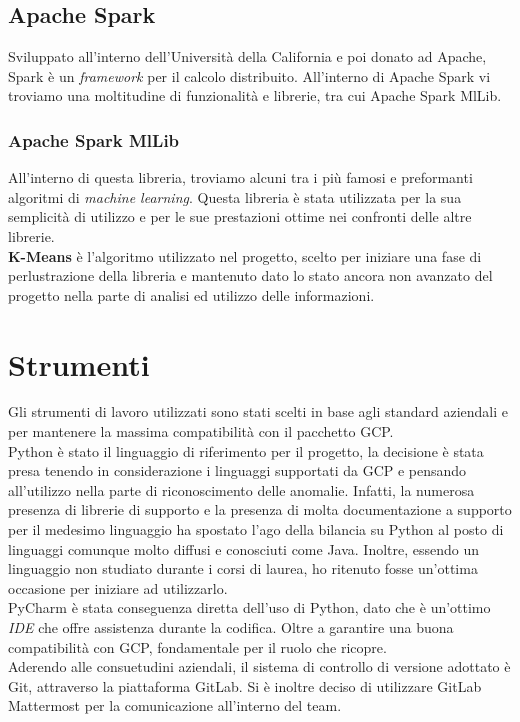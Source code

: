 \subsection{Apache Spark}
Sviluppato all'interno dell'Università della California e poi donato ad Apache, Spark è un \emph{framework} per il calcolo distribuito. 
All'interno di Apache Spark vi troviamo una moltitudine di funzionalità e librerie, tra cui Apache Spark MlLib.
\subsubsection{Apache Spark MlLib}
All'interno di questa libreria, troviamo alcuni tra i più famosi e preformanti algoritmi di \emph{machine learning}. Questa libreria è stata utilizzata per la sua semplicità di utilizzo e per le sue prestazioni ottime nei confronti delle altre librerie.
\\
\textbf{K-Means} \cite{k-means} è  l'algoritmo utilizzato nel progetto, scelto per iniziare una fase di perlustrazione della libreria e mantenuto dato lo stato ancora non avanzato del progetto nella parte di analisi ed utilizzo delle informazioni.
\section{Strumenti}
Gli strumenti di lavoro utilizzati sono stati scelti in base agli standard aziendali e per mantenere la massima compatibilità con il pacchetto GCP.
\\
Python è stato il linguaggio di riferimento per il progetto, la decisione è stata presa tenendo in considerazione i linguaggi supportati da GCP e pensando all'utilizzo nella parte di riconoscimento delle anomalie. Infatti, la numerosa presenza di librerie di supporto e la presenza di molta documentazione a supporto per il medesimo linguaggio ha spostato l'ago della bilancia su Python al posto di linguaggi comunque molto diffusi e conosciuti come Java. Inoltre, essendo un linguaggio non studiato durante i corsi di laurea, ho ritenuto fosse un'ottima occasione per iniziare ad utilizzarlo.
\\
PyCharm è stata conseguenza diretta dell'uso di Python, dato che è un'ottimo \emph{IDE} che offre assistenza durante la codifica. Oltre a garantire una buona compatibilità con GCP, fondamentale per il ruolo che ricopre.
\\
Aderendo alle consuetudini aziendali, il sistema di controllo di versione adottato è Git, attraverso la piattaforma GitLab. Si è inoltre deciso di utilizzare GitLab Mattermost per la comunicazione all'interno del team.

